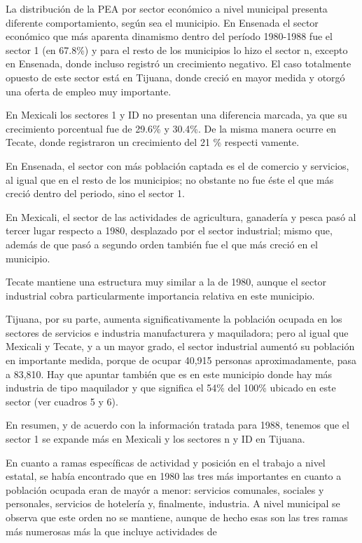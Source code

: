 \documentclass{article}
\begin{document}
La distribución de la PEA por sector económico a nivel municipal presenta diferente comportamiento, según sea el municipio. En Ensenada el sector económico que más aparenta dinamismo dentro del período 1980-1988 fue el sector 1 (en 67.8\%) y para el resto de los municipios lo hizo el sector n, excepto en Ensenada, donde incluso registró un crecimiento negativo. El caso totalmente opuesto de este sector está en Tijuana, donde creció en mayor medida y otorgó una oferta de empleo muy importante.

En Mexicali los sectores 1 y ID no presentan una diferencia marcada, ya que su crecimiento porcentual fue de 29.6\% y 30.4\%. De la misma manera ocurre en Tecate, donde registraron un crecimiento del 21 \% respecti vamente.

En Ensenada, el sector con más población captada es el de comercio y servicios, al igual que en el resto de los municipios; no obstante no fue éste el que más creció dentro del periodo, sino el sector 1.

En Mexicali, el sector de las actividades de agricultura, ganadería y pesca pasó al tercer lugar respecto a 1980, desplazado por el sector industrial; mismo que, además de que pasó a segundo orden también fue el que más creció en el municipio.

Tecate mantiene una estructura muy similar a la de 1980, aunque el sector industrial cobra particularmente importancia relativa en este municipio.

Tijuana, por su parte, aumenta significativamente la población ocupada en los sectores de servicios e industria manufacturera y maquiladora; pero al igual que Mexicali y Tecate, y a un mayor grado, el sector industrial aumentó su población en importante medida, porque de ocupar 40,915 personas aproximadamente, pasa a 83,810. Hay que apuntar también que es en este municipio donde hay más industria de tipo maquilador y que significa el 54\% del 100\% ubicado en este sector (ver cuadros 5 y 6).

En resumen, y de acuerdo con la información tratada para 1988, tenemos que el sector 1 se expande más en Mexicali y los sectores n y ID en Tijuana.

En cuanto a ramas específicas de actividad y posición en el trabajo a nivel estatal, se había encontrado que en 1980 las tres más importantes en cuanto a población ocupada eran de mayór a menor: servicios comunales, sociales y personales, servicios de hotelería y, finalmente, industria. A nivel municipal se observa que este orden no se mantiene, aunque de hecho esas son las tres ramas más numerosas más la que incluye actividades de
\end{document}
